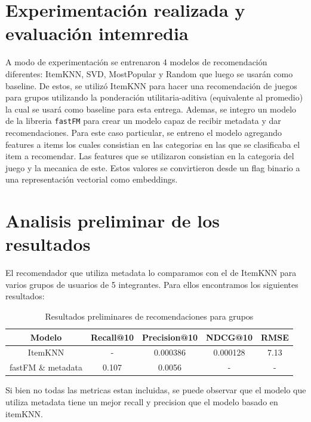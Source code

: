 \documentclass[11pt]{article}
\begin{document}
\section{Experimentación realizada y evaluación intemredia}
A modo de experimentación se entrenaron 4 modelos de recomendación diferentes: ItemKNN, SVD, MostPopular y Random que luego se usarán como baseline. 
De estos, se utilizó ItemKNN para hacer una recomendación de juegos para grupos utilizando la ponderación utilitaria-aditiva (equivalente al promedio) 
la cual se usará como baseline para esta entrega. Ademas, se integro un modelo de la libreria \texttt{fastFM} para crear un modelo capaz de recibir metadata y dar recomendaciones.
Para este caso particular, se entreno el modelo agregando features a items los cuales consistian en las categorias en las que se clasificaba el item a recomendar. Las features que se utilizaron 
consistian en la categoria del juego y la mecanica de este. Estos valores se convirtieron desde un flag binario a una representación vectorial como embeddings.

\section{Analisis preliminar de los resultados}
El recomendador que utiliza metadata lo comparamos con el de ItemKNN para varios grupos de usuarios de 5 integrantes. Para ellos encontramos los siguientes resultados:

\begin{table}[H]
    \centering
    \begin{tabular}{|c|c|c|c|c|}
        \hline
        \textbf{Modelo} & \textbf{Recall@10} & \textbf{Precision@10} & \textbf{NDCG@10} & \textbf{RMSE} \\ \hline
        ItemKNN & - & 0.000386 & 0.000128 & 7.13 \\ \hline
        fastFM \& metadata & 0.107 & 0.0056 & - & - \\ \hline
    \end{tabular}
    \caption{Resultados preliminares de recomendaciones para grupos}
    \label{tab:resultados_preliminares}
\end{table}

Si bien no todas las metricas estan incluidas, se puede observar que el modelo que utiliza metadata tiene un mejor recall y precision que el modelo basado en itemKNN.

\end{document}
